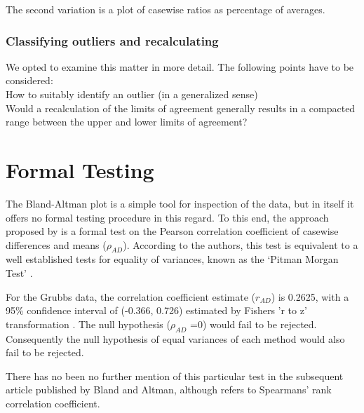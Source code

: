 \documentclass[12pt, a4paper]{report}
\begin{document}


The second variation is a plot of casewise ratios as percentage of
averages.


\newpage








\subsubsection{Classifying outliers and recalculating} We opted to
examine this matter in more detail. The following points have to
be considered:
\\
 \indent How to suitably identify an outlier (in a generalized sense)
\\
\indent Would a recalculation of the limits of agreement generally
results in  a compacted range between the upper and lower limits
of agreement?
\newpage



\section{Formal Testing}
The Bland-Altman plot is a simple tool for inspection of the data,
but in itself it offers no formal testing procedure in this
regard. To this end, the approach proposed by \citet{BA83} is a
formal test on the Pearson correlation coefficient  of casewise
differences and means ($\rho_{AD}$). According to the authors,
this test is equivalent to a well established tests for equality
of variances, known as the `Pitman Morgan Test' \citep{Pitman,
	Morgan}.

For the Grubbs data, the correlation coefficient estimate
($r_{AD}$) is 0.2625, with a 95\% confidence interval of (-0.366,
0.726) estimated by Fishers 'r to z' transformation \citep{Cohen}.
The null hypothesis ($\rho_{AD}$ =0) would fail to be rejected.
Consequently the null hypothesis of equal variances of each method
would also fail to be rejected.

There has no been no further mention of this particular test in
the subsequent article published by Bland and Altman, although
\citet{BA99} refers to Spearmans' rank correlation coefficient.


\end{document}
